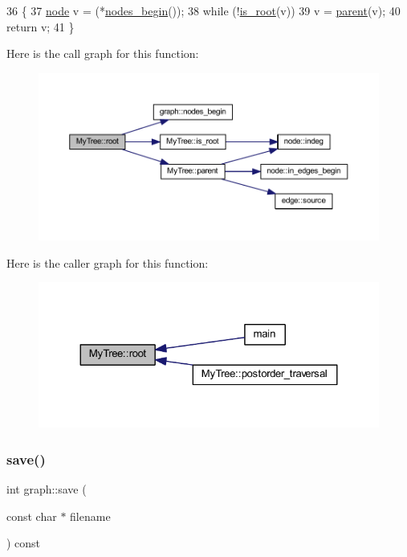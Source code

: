 \begin{DoxyCode}
36 \{
37     \mbox{\hyperlink{classnode}{node}} v = (*\mbox{\hyperlink{classgraph_aec053a4b509d1be804237a80044c54c0}{nodes\_begin}}());
38     \textcolor{keywordflow}{while} (!\mbox{\hyperlink{class_my_tree_a2590ac659aafc07741ee8bb28b457f54}{is\_root}}(v))
39         v = \mbox{\hyperlink{class_my_tree_a6dd1940094f32e411a4107c01a6997fb}{parent}}(v);
40     \textcolor{keywordflow}{return} v;
41 \}
\end{DoxyCode}
Here is the call graph for this function\+:\nopagebreak
\begin{figure}[H]
\begin{center}
\leavevmode
\includegraphics[width=350pt]{class_my_tree_a04b0f390bb74c3bdb157cad08872076e_cgraph}
\end{center}
\end{figure}
Here is the caller graph for this function\+:\nopagebreak
\begin{figure}[H]
\begin{center}
\leavevmode
\includegraphics[width=324pt]{class_my_tree_a04b0f390bb74c3bdb157cad08872076e_icgraph}
\end{center}
\end{figure}
\mbox{\label{classgraph_a7bd0712a528249d1585085a64ac3e661}} 
\subsubsection{\texorpdfstring{save()}{save()}\hspace{0.1cm}{\footnotesize\ttfamily [1/2]}}
{\footnotesize\ttfamily int graph\+::save (\begin{DoxyParamCaption}\item[{const char $\ast$}]{filename }\end{DoxyParamCaption}) const\hspace{0.3cm}{\ttfamily [inherited]}}

